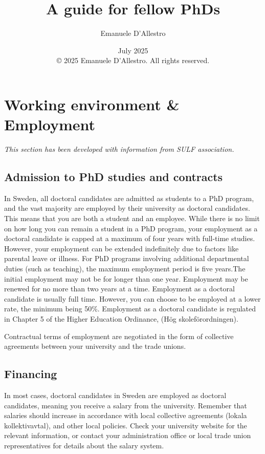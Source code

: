 \documentclass{article}
\title{\Huge A guide for fellow PhDs}
\author{Emanuele D'Allestro}
\date{\Large July 2025\\[1cm] \normalsize © 2025 Emanuele D'Allestro. All rights reserved.}
\begin{document}
\maketitle
\newpage
\tableofcontents

\newpage

\section{Working environment \& Employment}
\textit{This section has been developed with information from SULF association.}

\subsection{Admission to PhD studies and contracts}
In Sweden, all doctoral candidates are admitted as students to a PhD program,
and the vast majority are employed by their university as doctoral candidates. This means that you are both a student
and an employee. While there is no limit on how long you can remain a student
in a PhD program, your employment as a doctoral candidate is capped at a
maximum of four years with full-time
studies. However, your employment can be extended indefinitely due to
factors like parental leave or illness.
For PhD programs involving additional
departmental duties (such as teaching), the maximum employment period is
five years.The initial employment may
not be for longer than one year. Employment may be renewed for no more
than two years at a time. Employment
as a doctoral candidate is usually full time. However, you can choose to be
employed at a lower rate, the minimum being 50\%. Employment as a doctoral
candidate is regulated in Chapter 5 of the Higher Education Ordinance, (Hög
skoleförordningen).

Contractual terms of employment are negotiated in the form of collective
agreements between your university and the trade unions.

\subsection{Financing}
In most cases, doctoral candidates in Sweden are employed as doctoral
candidates, meaning you receive a salary from the university. Remember
that salaries should increase in accordance with local collective agreements
(lokala kollektivavtal), and other local
policies. Check your university website for the relevant information, or contact your administration office or local trade
union representatives for details about the salary system.
\end{document}
